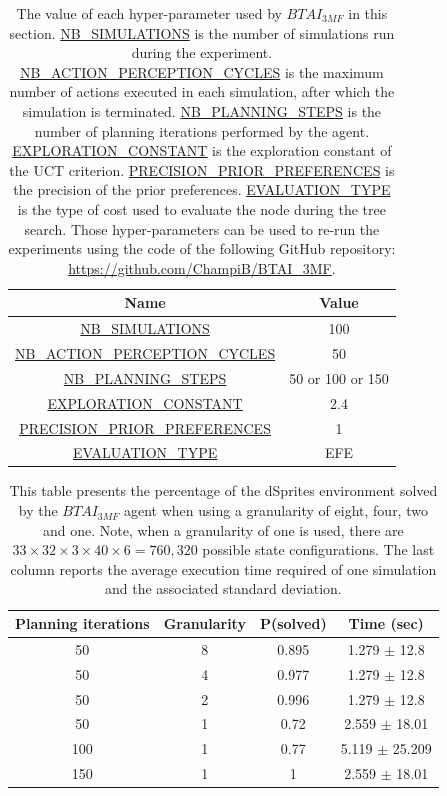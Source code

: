 \documentclass[twoside,11pt]{article}
\begin{document}
\begin{table}[H]
\centering
\begin{tabular}{ |c|c|  }
 \hline
 Name & Value\\
 \hline
 \hline
 \url{NB_SIMULATIONS} & 100\\
 \hline
 \url{NB_ACTION_PERCEPTION_CYCLES} & 50\\
 \hline
 \url{NB_PLANNING_STEPS} & 50 or 100 or 150\\
 \hline
 \url{EXPLORATION_CONSTANT} & 2.4\\
 \hline
 \url{PRECISION_PRIOR_PREFERENCES} & 1\\
 \hline
 \url{EVALUATION_TYPE} & EFE\\
 \hline
\end{tabular}
\caption{The value of each hyper-parameter used by $BTAI_{3MF}$ in this section. \url{NB_SIMULATIONS} is the number of simulations run during the experiment. \url{NB_ACTION_PERCEPTION_CYCLES} is the maximum number of actions executed in each simulation, after which the simulation is terminated. \url{NB_PLANNING_STEPS} is the number of planning iterations performed by the agent. \url{EXPLORATION_CONSTANT} is the exploration constant of the UCT criterion. \url{PRECISION_PRIOR_PREFERENCES} is the precision of the prior preferences. \url{EVALUATION_TYPE} is the type of cost used to evaluate the node during the tree search. Those hyper-parameters can be used to re-run the experiments using the code of the following GitHub repository: \url{https://github.com/ChampiB/BTAI_3MF}.}
\label{tab:values_hp_BTAI_3MF_dSprites}
\end{table}

\begin{table}[H]
\centering
\begin{tabular}{ |c|c|c|c| }
 \hline
 Planning iterations & Granularity & P(solved) & Time (sec) \\
 \hline
 50 & 8 & 0.895 & 1.279 $\pm$ 12.8 \\
 \hline
 50 & 4 & 0.977 & 1.279 $\pm$ 12.8 \\
 \hline
 50 & 2 & 0.996 & 1.279 $\pm$ 12.8 \\
 \hline
 50 & 1 & 0.72 & 2.559 $\pm$ 18.01 \\
 \hline
 100 & 1 & 0.77 & 5.119 $\pm$ 25.209 \\
 \hline
 150 & 1 & 1 & 2.559 $\pm$ 18.01 \\
 \hline
\end{tabular}
\caption{This table presents the percentage of the dSprites environment solved by the $BTAI_{3MF}$ agent when using a granularity of eight, four, two and one. Note, when a granularity of one is used, there are $33 \times 32 \times 3 \times 40 \times 6 = 760,320$ possible state configurations. The last column reports the average execution time required of one simulation and the associated standard deviation.}
\label{tab:btai_3mf_dSprites_res}
\end{table}
\end{document}
